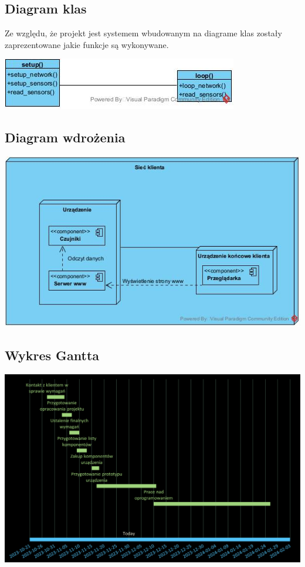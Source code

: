 \documentclass[12pt,a4paper]{article}
\begin{document}
\subsection{Diagram klas}

Ze względu, że projekt jest systemem wbudowanym na diagrame klas zostały zaprezentowane jakie
funkcje są wykonywane.

\includegraphics[width=\textwidth, center]{class-diagram.jpg}

\subsection{Diagram wdrożenia}
\includegraphics[width=\textwidth, center]{deployment-diagram.jpg}

\subsection{Wykres Gantta}
\includegraphics[width=\textwidth, center]{gantt.png}
\end{document}
